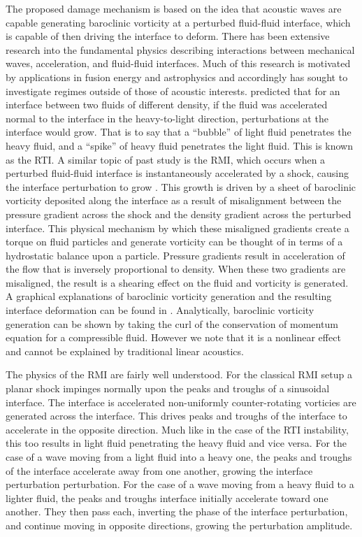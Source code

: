 The proposed damage mechanism is based on the idea that acoustic waves
are capable generating baroclinic vorticity at a perturbed fluid-fluid
interface, which is capable of then driving the interface to
deform. There has been extensive research into the fundamental physics
describing interactions between mechanical waves, acceleration, and
fluid-fluid interfaces. Much of this research is motivated by
applications in fusion energy and astrophysics and accordingly has
sought to investigate regimes outside of those of acoustic
interests. \cite{Taylor1950} predicted that for an interface between
two fluids of different density, if the fluid was accelerated normal
to the interface in the heavy-to-light direction, perturbations at the
interface would grow. That is to say that a ``bubble'' of light fluid
penetrates the heavy fluid, and a ``spike'' of heavy fluid penetrates
the light fluid. This is known as the \ac{RTI}. A similar topic of
past study is the \ac{RMI}, which occurs when a perturbed fluid-fluid
interface is instantaneously accelerated by a shock, causing the
interface perturbation to grow \citep{Brouillette2002,Drake2006}. This
growth is driven by a sheet of baroclinic vorticity deposited along
the interface as a result of misalignment between the pressure
gradient across the shock and the density gradient across the
perturbed interface. This physical mechanism by which these misaligned
gradients create a torque on fluid particles and generate vorticity
can be thought of in terms of a hydrostatic balance upon a
particle. Pressure gradients result in acceleration of the flow that
is inversely proportional to density. When these two gradients are
misaligned, the result is a shearing effect on the fluid and vorticity
is generated. A graphical explanations of baroclinic vorticity
generation and the resulting interface deformation can be found in
\citep{Heifetz2015}. Analytically, baroclinic vorticity generation can
be shown by taking the curl of the conservation of momentum equation
for a compressible fluid. However we note that it is a nonlinear
effect and cannot be explained by traditional linear acoustics.

The physics of the \ac{RMI} are fairly well understood. For the
classical \ac{RMI} setup a planar shock impinges normally upon the
peaks and troughs of a sinusoidal interface. The interface is
accelerated non-uniformly counter-rotating vorticies are generated
across the interface. This drives peaks and troughs of the interface
to accelerate in the opposite direction. Much like in the case of the
\ac{RTI} instability, this too results in light fluid penetrating the
heavy fluid and vice versa. For the case of a wave moving from a light
fluid into a heavy one, the peaks and troughs of the interface
accelerate away from one another, growing the interface perturbation
perturbation. For the case of a wave moving from a heavy fluid to a
lighter fluid, the peaks and troughs interface initially accelerate
toward one another. They then pass each, inverting the phase of the
interface perturbation, and continue moving in opposite directions,
growing the perturbation amplitude.


